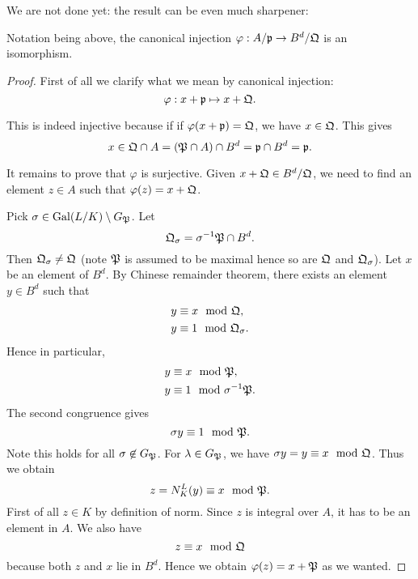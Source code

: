 				We are not done yet: the result can be even much sharpener:
				
				\begin{theorem}\label{residue-iso}
					Notation being above, the canonical injection $\varphi:A/\mathfrak{p} \to B^d/\mathfrak{Q}$ is an isomorphism.
				\end{theorem}
				
				\begin{proof}
					First of all we clarify what we mean by canonical injection:
					\[
						\varphi:x + \mathfrak{p} \mapsto x + \mathfrak{Q}.
					\]
					
					This is indeed injective because if if $\varphi(x+\mathfrak{p})=\mathfrak{Q}$, we have $x \in \mathfrak{Q}$. This gives
					\[
						x \in \mathfrak{Q} \cap A = (\mathfrak{P} \cap A) \cap B^d = \mathfrak{p} \cap B^d = \mathfrak{p}.
					\]
					
					It remains to prove that $\varphi$ is surjective. Given $x + \mathfrak{Q} \in B^d/\mathfrak{Q}$, we need to find an element $z \in A$ such that $\varphi(z) = x + \mathfrak{Q}$. 
					
					Pick $\sigma \in \operatorname{Gal}(L/K) \setminus G_\mathfrak{P}$. Let
					\[
						\mathfrak{Q}_\sigma = \sigma^{-1}\mathfrak{P} \cap B^d.
					\]
					Then $\mathfrak{Q}_\sigma \ne \mathfrak{Q}$ (note $\mathfrak{P}$ is assumed to be maximal hence so are $\mathfrak{Q}$ and $\mathfrak{Q}_\sigma$). Let $x$ be an element of $B^d$. By Chinese remainder theorem, there exists an element $y \in B^d$ such that
					\[
						\begin{aligned}
							y &\equiv x \mod {\mathfrak}{Q}, \\
							y &\equiv 1 \mod {\mathfrak}{Q}_\sigma.
						\end{aligned}
					\]
					Hence in particular,
					\[
						\begin{aligned}
							y &\equiv x \mod {\mathfrak}{P}, \\
							y &\equiv 1 \mod \sigma^{-1}\mathfrak{P}.
						\end{aligned}
					\]
					The second congruence gives
					\[
						\sigma{y} \equiv 1 \mod {\mathfrak}{P}.
					\]
					Note this holds for all $\sigma \not \in G_\mathfrak{P}$. For $\lambda \in G_\mathfrak{P}$, we have $\sigma{y}=y \equiv x \mod {\mathfrak}{Q}$. Thus we obtain
					\[
						z=N_K^L(y) \equiv x \mod {\mathfrak}{P}.
					\]
					First of all $z \in K$ by definition of norm. Since $z$ is integral over $A$, it has to be an element in $A$. We also have %
					\[
						z \equiv x \mod {\mathfrak}{Q}
					\]
					because both $z$ and $x$ lie in $B^d$. Hence we obtain $\varphi(z) = x + \mathfrak{P}$ as we wanted.
				\end{proof}
				
